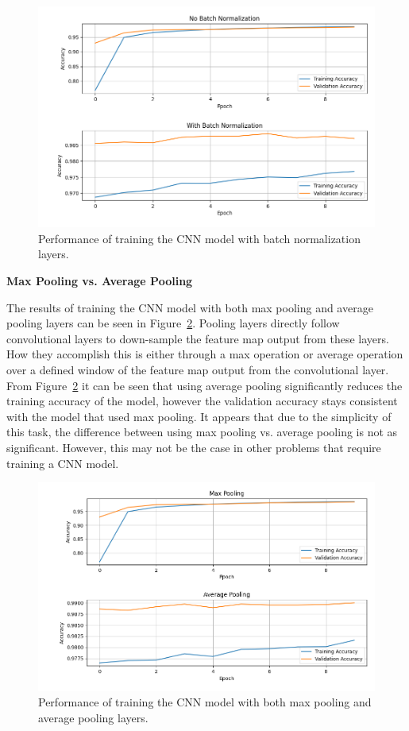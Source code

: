 \documentclass[a4paper]{article}
\begin{document}
\begin{figure}[h!]
    \centering
    \includegraphics[scale=0.5]{images/batch-norm-cnn.png}
    \caption{Performance of training the CNN model with batch normalization layers.}
    \label{fig:batch-norm}
\end{figure}

\newpage
\textbf{Max Pooling vs. Average Pooling}

The results of training the CNN model with both max pooling and average pooling layers can be seen in Figure~\ref{fig:pooling}. Pooling layers directly follow convolutional layers to down-sample the feature map output from these layers. How they accomplish this is either through a max operation or average operation over a defined window of the feature map output from the convolutional layer. From Figure~\ref{fig:pooling} it can be seen that using average pooling significantly reduces the training accuracy of the model, however the validation accuracy stays consistent with the model that used max pooling. It appears that due to the simplicity of this task, the difference between using max pooling vs. average pooling is not as significant. However, this may not be the case in other problems that require training a CNN model.

\begin{figure}[h!]
    \centering
    \includegraphics[scale=0.5]{images/max-avg-pooling-cnn.png}
    \caption{Performance of training the CNN model with both max pooling and average pooling layers.}
    \label{fig:pooling}
\end{figure}
\end{document}
